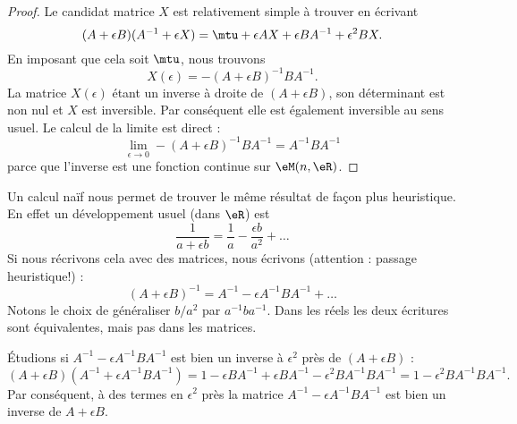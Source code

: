 \begin{proof}
    Le candidat matrice \( X\) est relativement simple à trouver en écrivant
    \begin{equation}
        (A+\epsilon B)(A^{-1}+\epsilon X)=\mtu+\epsilon AX+\epsilon BA^{-1}+\epsilon^2BX.
    \end{equation}
    En imposant que cela soit \( \mtu\), nous trouvons
    \begin{equation}
        X(\epsilon)=-(A+\epsilon B)^{-1} BA^{-1}.
    \end{equation}
    La matrice \( X(\epsilon)\) étant un inverse à droite de \( (A+\epsilon B)\), son déterminant est non nul et \( X\) est inversible. Par conséquent elle est également inversible au sens usuel. Le calcul de la limite est direct :
    \begin{equation}
        \lim_{\epsilon\to 0}-(A+\epsilon B)^{-1} BA^{-1}=A^{-1} BA^{-1}
    \end{equation}
    parce que l'inverse est une fonction continue sur \( \eM(n,\eR)\).
\end{proof}

\begin{remark}
    Un calcul naïf nous permet de trouver le même résultat de façon plus heuristique. En effet un développement usuel (dans \( \eR\)) est
    \begin{equation}
        \frac{1}{ a+\epsilon b }=\frac{1}{ a }-\frac{ \epsilon b }{ a^2 }+\ldots
    \end{equation}
    Si nous récrivons cela avec des matrices, nous écrivons (attention : passage heuristique!) :
    \begin{equation}
        (A+\epsilon B)^{-1}=A^{-1}-\epsilon A^{-1} BA^{-1}+\ldots
    \end{equation}
    Notons le choix de généraliser \( b/a^2\) par \( a^{-1} ba^{-1}\). Dans les réels les deux écritures sont équivalentes, mais pas dans les matrices.

    Étudions si \( A^{-1}-\epsilon A^{-1}BA^{-1}\) est bien un inverse à \( \epsilon^2\) près de \( (A+\epsilon B)\) :
    \begin{equation}
        (A+\epsilon B)(A^{-1}+\epsilon A^{-1} BA^{-1})=1-\epsilon BA^{-1}+\epsilon BA^{-1}-\epsilon^2BA^{-1}BA^{-1}=1-\epsilon^2BA^{-1} BA^{-1}.
    \end{equation}
    Par conséquent, à des termes en \( \epsilon^2\) près la matrice \( A^{-1}-\epsilon A^{-1}BA^{-1}\) est bien un inverse de \( A+\epsilon B\).
\end{remark}

